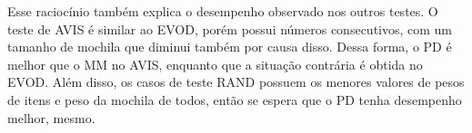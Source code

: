 \documentclass{article}[twocolumn]
\begin{document}
	Esse racioc\'inio tamb\'em explica o desempenho observado nos outros testes. O teste de
	AVIS \'e similar ao EVOD, por\'em possui n\'umeros consecutivos, com um tamanho de mochila que
	diminui tamb\'em por causa disso. Dessa forma, o PD \'e melhor que o MM no AVIS, enquanto
	que a situa\c{c}\~ao contr\'aria \'e obtida no EVOD. Al\'em disso, os casos de teste RAND
	possuem os menores valores de pesos de itens e peso da mochila de todos, ent\~ao se espera
	que o PD tenha desempenho melhor, mesmo.
\end{document}
